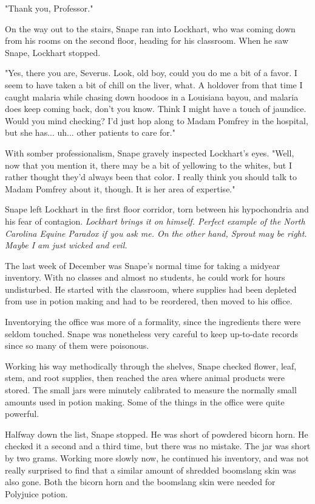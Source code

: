 \documentclass[a4paper,11pt]{article}
\begin{document}
"Thank you, Professor."

On the way out to the stairs, Snape ran into Lockhart, who was coming down from his rooms on the second floor, heading for his classroom. When he saw Snape, Lockhart stopped.

"Yes, there you are, Severus. Look, old boy, could you do me a bit of a favor. I seem to have taken a bit of chill on the liver, what. A holdover from that time I caught malaria while chasing down hoodoos in a Louisiana bayou, and malaria does keep coming back, don't you know. Think I might have a touch of jaundice. Would you mind checking? I'd just hop along to Madam Pomfrey in the hospital, but she has... uh... other patients to care for."

With somber professionalism, Snape gravely inspected Lockhart's eyes. "Well, now that you mention it, there may be a bit of yellowing to the whites, but I rather thought they'd always been that color. I really think you should talk to Madam Pomfrey about it, though. It is her area of expertise."

Snape left Lockhart in the first floor corridor, torn between his hypochondria and his fear of contagion. \emph{Lockhart brings it on himself. Perfect example of the North Carolina Equine Paradox if you ask me. On the other hand, Sprout may be right. Maybe I am just wicked and evil.}

The last week of December was Snape's normal time for taking a midyear inventory. With no classes and almost no students, he could work for hours undisturbed. He started with the classroom, where supplies had been depleted from use in potion making and had to be reordered, then moved to his office.

Inventorying the office was more of a formality, since the ingredients there were seldom touched. Snape was nonetheless very careful to keep up-to-date records since so many of them were poisonous.

Working his way methodically through the shelves, Snape checked flower, leaf, stem, and root supplies, then reached the area where animal products were stored. The small jars were minutely calibrated to measure the normally small amounts used in potion making. Some of the things in the office were quite powerful.

Halfway down the list, Snape stopped. He was short of powdered bicorn horn. He checked it a second and a third time, but there was no mistake. The jar was short by two grams. Working more slowly now, he continued his inventory, and was not really surprised to find that a similar amount of shredded boomslang skin was also gone. Both the bicorn horn and the boomslang skin were needed for Polyjuice potion.
\end{document}
